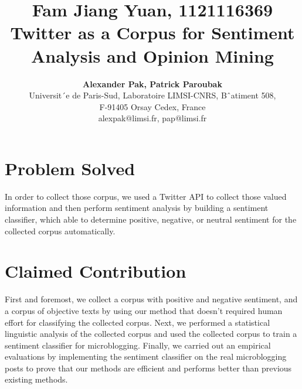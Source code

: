 \documentclass[a4paper,12pt]{article}
\begin{document}


\title{\textbf{{\large Fam Jiang Yuan, 1121116369}\vspace{5mm}\\Twitter as a Corpus for Sentiment Analysis and Opinion Mining}}
\author{\textbf{Alexander Pak, Patrick Paroubak}\vspace{5mm} \\Universit´e de Paris-Sud, Laboratoire LIMSI-CNRS, Bˆatiment 508,\\
F-91405 Orsay Cedex, France\\
alexpak@limsi.fr, pap@limsi.fr}
\date{}
\maketitle


\section*{\textbf{Problem Solved}}
In order to collect those corpus, we used a Twitter API to collect those valued information and then perform sentiment analysis by building a sentiment classifier, which able to determine positive, negative, or neutral sentiment for the collected corpus automatically.

\section*{\textbf{Claimed Contribution}}
First and foremost, we collect a corpus with positive and negative sentiment, and a corpus of objective texts by using our method that doesn't required human effort for classifying the collected corpus.
Next, we performed a statistical linguistic analysis of the collected corpus and used the collected corpus to train a sentiment classifier for microblogging.
Finally, we carried out an empirical evaluations by implementing the sentiment classifier on the real microblogging posts to prove that our methods are efficient and performs better than previous existing methods.
\end{document}
